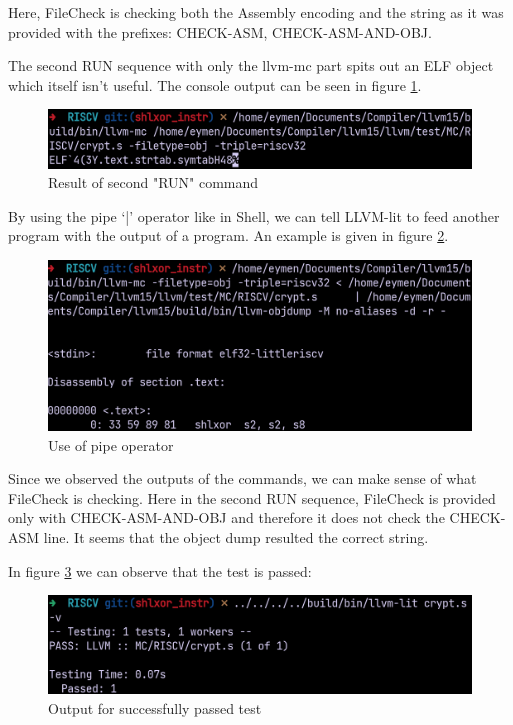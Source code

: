Here, FileCheck is checking both the Assembly encoding and the string as it was provided with the prefixes: CHECK-ASM, CHECK-ASM-AND-OBJ.


The second RUN sequence with only the llvm-mc part spits out an ELF object which itself isn’t useful. The console output can be seen in figure \ref{fig:result_of_second_run_command}.
\begin{figure}
    \centering
    \includegraphics[scale=0.9]{testing/result_of_second_run_command.png}
    \caption{Result of second "RUN" command}
    \label{fig:result_of_second_run_command}
\end{figure}

By using the pipe ‘|’ operator like in Shell, we can tell LLVM-lit to feed another program with the output of a program. An example is given in figure \ref{fig:use_of_pipe_operator}.
\begin{figure}
    \centering
    \includegraphics[scale=0.9]{testing/use_of_pipe_operator.png}
    \caption{Use of pipe operator}
    \label{fig:use_of_pipe_operator}
\end{figure}

Since we observed the outputs of the commands, we can make sense of what FileCheck is checking. Here in the second RUN sequence, FileCheck is provided only with CHECK-ASM-AND-OBJ and therefore it does not check the CHECK-ASM line. It seems that the object dump resulted the correct string.

In figure \ref{fig:output_for_successfully_passed_test} we can observe that the test is passed:

\begin{figure}
    \centering
    \includegraphics[scale=0.9]{testing/output_for_successfully_passed_test.png}
    \caption{Output for successfully passed test}
    \label{fig:output_for_successfully_passed_test}
\end{figure}

